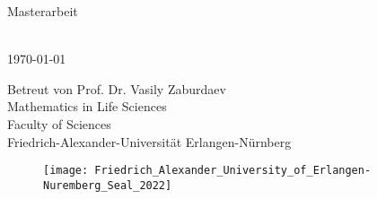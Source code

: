 \begin{titlepage}
\begin{center}
\Large
Masterarbeit\\
\vspace{1.cm}
\Huge
\makeatletter
\textbf{\@title}

\Large

\vspace{3.cm}

\textbf{\@author{}}\\
\today
\vspace{5.cm}
\large

Betreut von Prof. Dr. Vasily Zaburdaev\\

Mathematics in Life Sciences\\
Faculty of Sciences\\
Friedrich-Alexander-Universität Erlangen-Nürnberg\\

\begin{figure}[h]
    \centering
    \texttt{[image: Friedrich\_Alexander\_University\_of\_Erlangen-Nuremberg\_Seal\_2022]}
\end{figure}


\vfill
\large


\makeatother

\end{center}
\end{titlepage}
